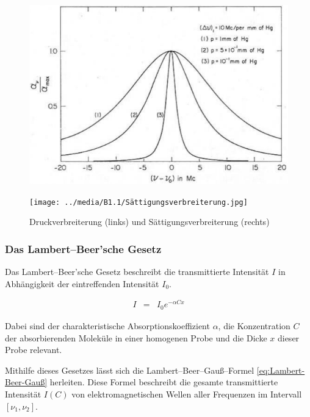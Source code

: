 \documentclass[12pt,a4paper]{scrartcl}
\numberwithin{equation}{section} %
\begin{document}
\begin{figure}[h]
	\centering
	\begin{minipage}{0.49\textwidth}
		\includegraphics[width=\textwidth]{../media/B1.1/Druckverbreiterung.jpg}
	\end{minipage}
	\begin{minipage}{0.49\textwidth}
		\texttt{[image: ../media/B1.1/Sättigungsverbreiterung.jpg]}
	\end{minipage}
	\caption{Druckverbreiterung (links) und Sättigungsverbreiterung (rechts) \cite{UzK}}
	\label{abb:Druckverbreiterung & Sättigungsverbreiterung}
\end{figure}

\hypertarget{das-lambertbeersche-gesetz}{\subsubsection{Das Lambert--Beer'sche Gesetz}\label{das-lambertbeersche-gesetz}}
Das Lambert--Beer'sche Gesetz beschreibt die transmittierte Intensität $I$ in Abhängigkeit der eintreffenden Intensität $I_0$. \cite{HakenWolf} %

\begin{eqnarray}
	I &=& I_0 e^{- \alpha C x} \label{eq:Lambert-Beer}
\end{eqnarray}

\noindent
Dabei sind der charakteristische Absorptionskoeffizient $\alpha$, die Konzentration $C$ der absorbierenden Moleküle in einer homogenen Probe und die Dicke $x$ dieser Probe relevant.

Mithilfe dieses Gesetzes lässt sich die Lambert--Beer--Gauß--Formel \eqref{eq:Lambert-Beer-Gauß} herleiten. Diese Formel beschreibt die gesamte transmittierte Intensität $I(C)$ von elektromagnetischen Wellen aller Frequenzen im Intervall $[\nu_1, \nu_2]$.
\end{document}
